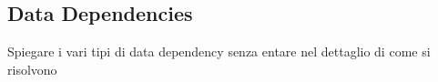 \subsection{Data Dependencies}
Spiegare i vari tipi di data dependency senza entare nel dettaglio di come si risolvono